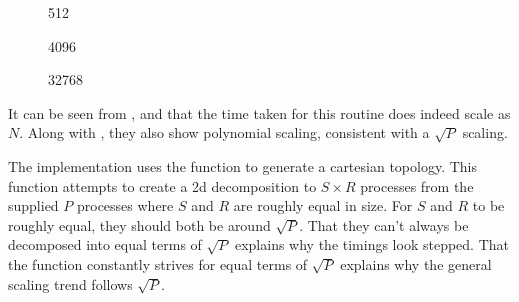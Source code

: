 %
%
\begin{figure}[!h]
    
    \caption{
        \vZeroTimeCaption
            {\replicatedsystolicloop{}}
            {\individualoperation{}}
            {512}
    }
    \label{fig:v1_replicated_systolic_individual_operation_512_time}
\end  {figure}

\begin{figure}[!h]
    
    \caption{
        \vZeroTimeCaption
            {\replicatedsystolicloop{}}
            {\individualoperation{}}
            {4096}
    }
    \label{fig:v1_replicated_systolic_individual_operation_4096_time}
\end  {figure}

\begin{figure}[!h]
    
    \caption{
        \vZeroTimeCaption
            {\replicatedsystolicloop{}}
            {\individualoperation{}}
            {32768}
    }
    \label{fig:v1_replicated_systolic_individual_operation_32768_time}
\end  {figure}


\vZeroTimeExplanation
    {}
    {}
    {}
    {\individualoperation{}}
    {\replicatedsystolicloop{}}

%
It can be seen from
,
 and
that the time taken for this routine does indeed scale as $N$.
%
Along with 
,
they also show polynomial scaling, consistent with a $\sqrt{P}$ scaling.

The implementation uses the \mpidimscreate{} function to generate a
cartesian topology.
%
This function attempts to create a 2d decomposition to $S \times{} R$
processes from the supplied $P$ processes where $S$ and $R$ are roughly
equal in size.
%
For $S$ and $R$ to be roughly equal, they should both be around $\sqrt{P}$.
%
That they can't always be decomposed into equal terms of $\sqrt{P}$
explains why the timings look stepped.
%
That the function constantly strives for equal terms of $\sqrt{P}$
explains why the general scaling trend follows $\sqrt{P}$.

